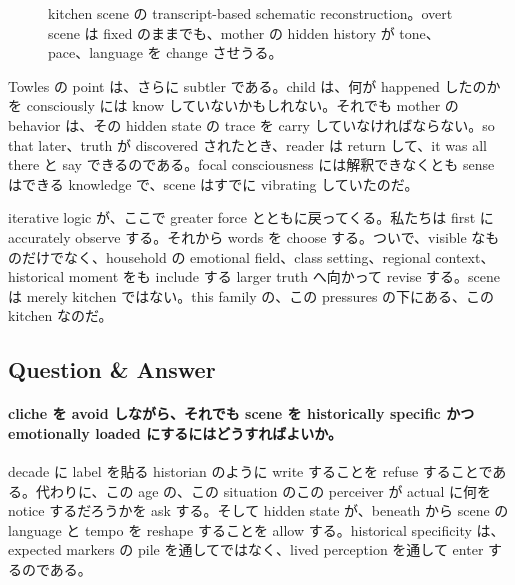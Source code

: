 \begin{figure}[h]
\centering
{}
\caption{kitchen scene の transcript-based schematic reconstruction。overt scene は fixed のままでも、mother の hidden history が tone、pace、language を change させうる。}
\end{figure}

Towles の point は、さらに subtler である。child は、何が happened したのかを consciously には know していないかもしれない。それでも mother の behavior は、その hidden state の trace を carry していなければならない。so that later、truth が discovered されたとき、reader は return して、it was all there と say できるのである。focal consciousness には解釈できなくとも sense はできる knowledge で、scene はすでに vibrating していたのだ。

iterative logic が、ここで greater force とともに戻ってくる。私たちは first に accurately observe する。それから words を choose する。ついで、visible なものだけでなく、household の emotional field、class setting、regional context、historical moment をも include する larger truth へ向かって revise する。scene は merely kitchen ではない。this family の、この pressures の下にある、この kitchen なのだ。

\subsection{Question \& Answer}

\paragraph{cliche を avoid しながら、それでも scene を historically specific かつ emotionally loaded にするにはどうすればよいか。}

decade に label を貼る historian のように write することを refuse することである。代わりに、この age の、この situation のこの perceiver が actual に何を notice するだろうかを ask する。そして hidden state が、beneath から scene の language と tempo を reshape することを allow する。historical specificity は、expected markers の pile を通してではなく、lived perception を通して enter するのである。

